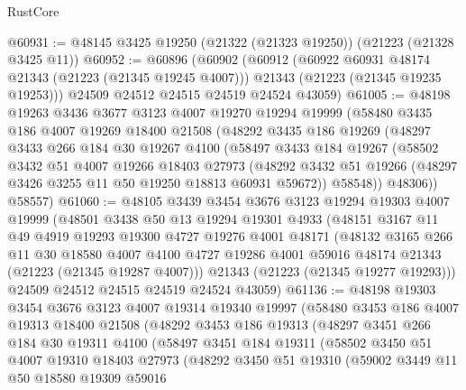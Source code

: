 \begin{lexlean}{RustCore}
\begin{coremodule}
@60931 := @48145 @3425 @19250 (@21322 (@21323 @19250)) (@21223 (@21328 @3425 @11))
@60952 := @60896
    (@60902
      (@60912
        (@60922 @60931 @48174 @21343 (@21223 (@21345 @19245 @4007)))
        @21343
        (@21223 (@21345 @19235 @19253)))
      @24509
      @24512
      @24515
      @24519
      @24524
      @43059)
@61005 := @48198
    @19263
    @3436
    @3677
    @3123
    @4007
    @19270
    @19294
    @19999
    (@58480
      @3435
      @186
      @4007
      @19269
      @18400
      @21508
      (@48292
        @3435
        @186
        @19269
        (@48297
          @3433
          @266
          @184
          @30
          @19267
          @4100
          (@58497
            @3433
            @184
            @19267
            (@58502
              @3432
              @51
              @4007
              @19266
              @18403
              @27973
              (@48292 @3432 @51 @19266 (@48297 @3426 @3255 @11 @50 @19250 @18813 @60931 @59672))
              @58548))
          @48306))
      @58557)
@61060 := @48105
    @3439
    @3454
    @3676
    @3123
    @19294
    @19303
    @4007
    @19999
    (@48501
      @3438
      @50
      @13
      @19294
      @19301
      @4933
      (@48151
        @3167
        @11
        @49
        @4919
        @19293
        @19300
        @4727
        @19276
        @4001
        @48171
        (@48132
          @3165
          @266
          @11
          @30
          @18580
          @4007
          @4100
          @4727
          @19286
          @4001
          @59016
          @48174
          @21343
          (@21223 (@21345 @19287 @4007)))
        @21343
        (@21223 (@21345 @19277 @19293)))
      @24509
      @24512
      @24515
      @24519
      @24524
      @43059)
@61136 := @48198
    @19303
    @3454
    @3676
    @3123
    @4007
    @19314
    @19340
    @19997
    (@58480
      @3453
      @186
      @4007
      @19313
      @18400
      @21508
      (@48292
        @3453
        @186
        @19313
        (@48297
          @3451
          @266
          @184
          @30
          @19311
          @4100
          (@58497
            @3451
            @184
            @19311
            (@58502
              @3450
              @51
              @4007
              @19310
              @18403
              @27973
              (@48292
                @3450
                @51
                @19310
                (@59002
                  @3449
                  @11
                  @50
                  @18580
                  @19309
                  @59016

\end{coremodule}
\end{lexlean}
